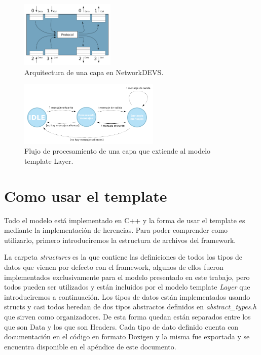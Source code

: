 \documentclass[10pt,a4paper]{article}
\begin{document}
\begin{figure}[htbp]
    \centering
    \includegraphics[width = 0.4\textwidth]{img/png/layer_architecture.png}
    \caption{Arquitectura de una capa en NetworkDEVS.}
    \label{figure:layer general architecture}
\end{figure}

\begin{figure}[htbp]
    \centering
    \includegraphics[width = 0.6\textwidth]{img/png/processing_flow.png}
    \caption{Flujo de procesamiento de una capa que extiende al modelo template Layer.}
    \label{figure:processing flow}
\end{figure}

\section{Como usar el template}

Todo el modelo está implementado en C++ y la forma de usar el template es mediante la implementación de herencias. Para poder comprender como utilizarlo, primero introduciremos la estructura de archivos del framework. \\


\medskip

La carpeta \textit{structures} es la que contiene las definiciones de todos los tipos de datos que vienen por defecto con el framework, algunos de ellos fueron implementados exclusivamente para el modelo presentado en este trabajo, pero todos pueden ser utilizados y están incluidos por el modelo template \textit{Layer} que introduciremos a continuación. Los tipos de datos están implementados usando structs y casi todos heredan de dos tipos abstractos definidos en \textit{abstract\_types.h} que sirven como organizadores. De esta forma quedan están separados entre los que son Data y los que son Headers. Cada tipo de dato definido cuenta con documentación en el código en formato Doxigen y la misma fue exportada y se encuentra disponible en el apéndice de este documento. \\
\end{document}
